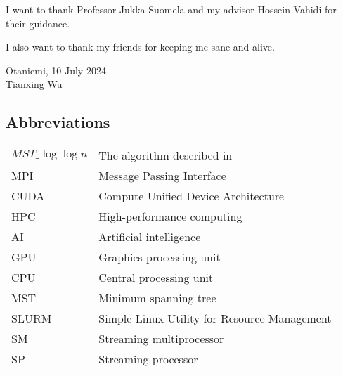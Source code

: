 \documentclass[english, 12pt, a4paper, elec, utf8, a-2b, online]{aaltothesis}
\date{10 July 2024}
\newcommand{\mstalgo}{$MST\_\log\log{n}$}
\begin{document}
\makecoverpage

\makecopyrightpage

\clearpage

\begin{abstractpage}[english]
	\abstracttext{}
\end{abstractpage}

\newpage

\dothesispagenumbering{}

I want to thank Professor Jukka Suomela and my advisor Hossein Vahidi for their guidance.

I also want to thank my friends for keeping me sane and alive.

\vspace{5cm}
Otaniemi, 10 July 2024\\

\vspace{5mm}
{\hfill Tianxing Wu \hspace{1cm}}

\newpage


\thesistableofcontents




\subsection*{Abbreviations}

\begin{tabular}{ll}
\mstalgo{}         & The algorithm described in \cite{MSTLogLogn} \\
MPI                & Message Passing Interface \\
CUDA               & Compute Unified Device Architecture \\
HPC                & High-performance computing \\
AI                 & Artificial intelligence \\
GPU                & Graphics processing unit \\
CPU                & Central processing unit \\
MST                & Minimum spanning tree \\
SLURM              & Simple Linux Utility for Resource Management \\
SM 							   & Streaming multiprocessor \\
SP 							   & Streaming processor \\
\end{tabular}
\end{document}
